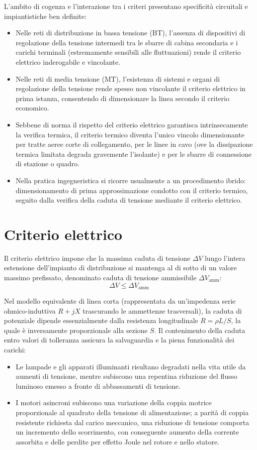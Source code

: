 L'ambito di cogenza e l'interazione tra i criteri presentano specificità circuitali e impiantistiche ben definite:
\begin{itemize}
    \item Nelle reti di distribuzione in bassa tensione (BT), l'assenza di dispositivi di regolazione della tensione intermedi tra le sbarre di cabina secondaria e i carichi terminali (estremamente sensibili alle fluttuazioni) rende il criterio elettrico inderogabile e vincolante.
    \item Nelle reti di media tensione (MT), l'esistenza di sistemi e organi di regolazione della tensione rende spesso non vincolante il criterio elettrico in prima istanza, consentendo di dimensionare la linea secondo il criterio economico.
    \item Sebbene di norma il rispetto del criterio elettrico garantisca intrinsecamente la verifica termica, il criterio termico diventa l'unico vincolo dimensionante per tratte aeree corte di collegamento, per le linee in cavo (ove la dissipazione termica limitata degrada gravemente l'isolante) e per le sbarre di connessione di stazione o quadro.
    \item Nella pratica ingegneristica si ricorre usualmente a un procedimento ibrido: dimensionamento di prima approssimazione condotto con il criterio termico, seguito dalla verifica della caduta di tensione mediante il criterio elettrico.
\end{itemize}

\section{Criterio elettrico}
Il criterio elettrico impone che la massima caduta di tensione $\Delta V$ lungo l'intera estensione dell'impianto di distribuzione si mantenga al di sotto di un valore massimo prefissato, denominato caduta di tensione ammissibile $\Delta V_{\text{amm}}$:
\[ \Delta V \le \Delta V_{\text{amm}} \]

Nel modello equivalente di linea corta (rappresentata da un'impedenza serie ohmico-induttiva $R + jX$ trascurando le ammettenze trasversali), la caduta di potenziale dipende essenzialmente dalla resistenza longitudinale $R = \rho L / S$, la quale è inversamente proporzionale alla sezione $S$. Il contenimento della caduta entro valori di tolleranza assicura la salvaguardia e la piena funzionalità dei carichi:
\begin{itemize}
    \item Le lampade e gli apparati illuminanti risultano degradati nella vita utile da aumenti di tensione, mentre subiscono una repentina riduzione del flusso luminoso emesso a fronte di abbassamenti di tensione.
    \item I motori asincroni subiscono una variazione della coppia motrice proporzionale al quadrato della tensione di alimentazione; a parità di coppia resistente richiesta dal carico meccanico, una riduzione di tensione comporta un incremento dello scorrimento, con conseguente aumento della corrente assorbita e delle perdite per effetto Joule nel rotore e nello statore.
\end{itemize}

